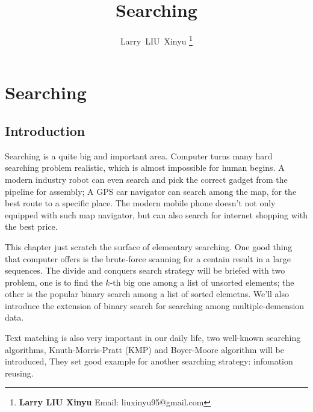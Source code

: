 \documentclass{article}
\begin{document}
\fi


\title{Searching}

\author{Larry~LIU~Xinyu
\thanks{{\bfseries Larry LIU Xinyu } \newline
  Email: liuxinyu95@gmail.com \newline}
  }


\maketitle

\ifx\wholebook\relax
\chapter{Searching}
\fi

\section{Introduction}
\label{introduction} 
Searching is a quite big and important area. Computer turns many hard
searching problem realistic, which is almost impossible for human begins.
A modern industry robot can even search and pick the correct gadget from
the pipeline for assembly; A GPS car navigator can search among the
map, for the best route to a specific place. The modern mobile phone
doesn't not only equipped with such map navigator, but can also search
for internet shopping with the best price.

This chapter just scratch the surface of elementary searching. One
good thing that computer offers is the brute-force scanning for a
centain result in a large sequences. The divide and conquers
search strategy will be briefed with two problem, one is to find
the $k$-th big one among a list of unsorted elements; the other
is the popular binary search among a list of sorted elemetns.
We'll also introduce the extension of binary search for searching
among multiple-demension data.

Text matching is also very important in our daily life, two well-known
searching algorithms, Knuth-Morris-Pratt (KMP) and Boyer-Moore algorithm
will be introduced, They set good example for another searching strategy:
infomation reusing.
\end{document}
